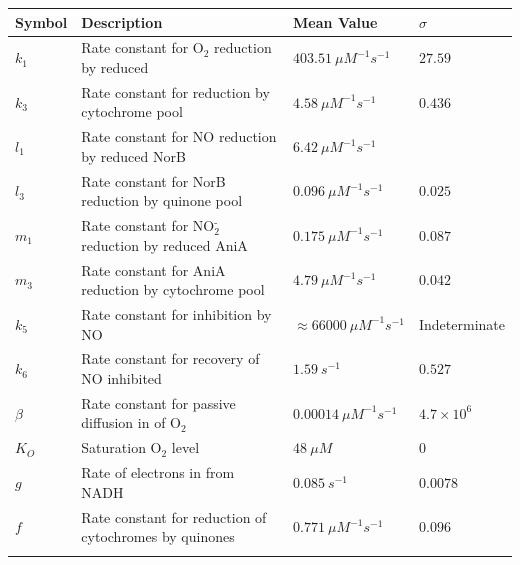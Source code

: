 \begin{table}[tbp]
\begin{center}
\begin{tabular}{>{\centering}m{1.4cm}>{\centering}m{6.1cm}>{\centering}m{2.7cm}>{\centering}m{2.5cm}}
\toprule
\textbf{Symbol} & \textbf{Description} & \textbf{Mean Value} & \textbf{$\sigma$}
\tabularnewline
\midrule
$k_1$ & Rate constant for O$_{\textrm{2}}$ reduction by reduced \cbbthree{} & $403.51~\mu M^{-1} s^{-1}$ & $27.59$
\tabularnewline\noalign{\smallskip}\hline\noalign{\smallskip}

$k_3$ & Rate constant for \cbbthree{} reduction by cytochrome pool & $4.58~\mu M^{-1} s^{-1}$ & $0.436$
\tabularnewline\noalign{\smallskip}\hline\noalign{\smallskip}

$l_1$ & Rate constant for NO reduction by reduced NorB & $6.42~\mu M^{-1} s^{-1}$ & 2.33
\tabularnewline\noalign{\smallskip}\hline\noalign{\smallskip}

$l_3$ & Rate constant for NorB reduction by quinone pool & $0.096~\mu M^{-1} s^{-1}$ & $0.025$
\tabularnewline\noalign{\smallskip}\hline\noalign{\smallskip}

$m_1$ & Rate constant for NO$_{\textrm{2}}^{\textrm{-}}$ reduction by reduced AniA & $0.175~\mu M^{-1} s^{-1}$ & $0.087$
\tabularnewline\noalign{\smallskip}\hline\noalign{\smallskip}

$m_3$ & Rate constant for AniA reduction by cytochrome pool & $4.79~\mu M^{-1}s^{-1}$ & $0.042$
\tabularnewline\noalign{\smallskip}\hline\noalign{\smallskip}

$k_5$ & Rate constant for \cbbthree{} inhibition by NO & $\approx66000~\mu M ^{-1} s ^{-1}$ & Indeterminate
\tabularnewline\noalign{\smallskip}\hline\noalign{\smallskip}

$k_6$ & Rate constant for recovery of NO inhibited \cbbthree{} & $1.59~s^{-1}$ & $0.527$
\tabularnewline\noalign{\smallskip}\hline\noalign{\smallskip}

$\beta$ & Rate constant for passive diffusion in of O$_{\textrm{2}}$ & $0.00014~\mu M^{-1} s^{-1}$ & $4.7\times10^6$
\tabularnewline\noalign{\smallskip}\hline\noalign{\smallskip}

$K_O$ & Saturation O$_{\textrm{2}}$ level & $48~\mu M$ & $0$
\tabularnewline\noalign{\smallskip}\hline\noalign{\smallskip}

$g$ & Rate of electrons in from NADH & $0.085~s^{-1}$ & $0.0078$
\tabularnewline\noalign{\smallskip}\hline\noalign{\smallskip}

$f$ & Rate constant for reduction of cytochromes by quinones & $0.771~\mu M^{-1}s^{-1}$ & $0.096$
\tabularnewline\noalign{\smallskip}\hline\noalign{\smallskip}


\end{tabular}
\end{center}
\end{table}
